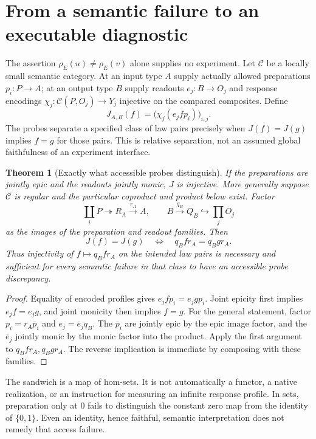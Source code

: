 \documentclass[11pt]{article}
\newtheorem{theorem}{Theorem}[section]
\theoremstyle{definition}
\theoremstyle{remark}\newtheorem{remark}[theorem]{Remark}
\newcommand{\C}{\mathcal C}
\begin{document}
\section{From a semantic failure to an executable diagnostic}
\label{sec:diagnostic}
The assertion $\rho_E(u)\ne\rho_E(v)$ alone supplies no experiment. Let
$\C$ be a locally small semantic category. At an input type $A$ supply
actually allowed preparations $p_i:P\to A$; at an output type $B$ supply
readouts $e_j:B\to O_j$ and response encodings
$\chi_j:\C(P,O_j)\to Y_j$ injective on the compared composites. Define
\[
 J_{A,B}(f)=\bigl(\chi_j(e_j f p_i)\bigr)_{i,j}.
\]
The probes separate a specified class of law pairs precisely when
$J(f)=J(g)$ implies $f=g$ for those pairs. This is relative separation,
not an assumed global faithfulness of an experiment interface.

\begin{theorem}[Exactly what accessible probes distinguish]\label{thm:access}
If the preparations are jointly epic and the readouts jointly monic, $J$
is injective. More generally suppose $\C$ is regular and the particular
coproduct and product below exist. Factor
\[
 \coprod_iP\twoheadrightarrow R_A\xrightarrow{r_A}A,
 \qquad B\xrightarrow{q_B}Q_B\hookrightarrow\prod_jO_j
\]
as the images of the preparation and readout families. Then
\[
 J(f)=J(g)\quad\Longleftrightarrow\quad q_B f r_A=q_B g r_A.
\]
Thus injectivity of $f\mapsto q_B f r_A$ on the intended law pairs is
necessary and sufficient for every semantic failure in that class to have
an accessible probe discrepancy.
\end{theorem}
\begin{proof}
Equality of encoded profiles gives $e_jfp_i=e_jgp_i$. Joint epicity first
implies $e_jf=e_jg$, and joint monicity then implies $f=g$.
For the general statement, factor $p_i=r_A\bar p_i$ and
$e_j=\bar e_jq_B$. The $\bar p_i$ are jointly epic by the epic image
factor, and the $\bar e_j$ jointly monic by the monic factor into the
product. Apply the first argument to $q_Bfr_A,q_Bgr_A$. The reverse
implication is immediate by composing with these families.
\end{proof}
The sandwich is a map of hom-sets. It is not automatically a functor,
a native realization, or an instruction for measuring an infinite response
profile. In sets, preparation only at $0$ fails to distinguish the constant
zero map from the identity of $\{0,1\}$. Even an identity, hence faithful,
semantic interpretation does not remedy that access failure.
\end{document}
